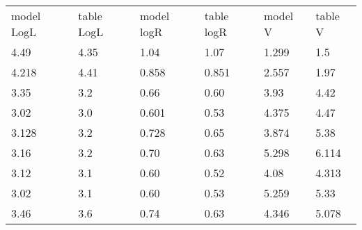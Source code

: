 \documentclass[a4paper,10pt]{article}
\date{02/05/15}
\begin{document}
 \begin{center}
\begin{tabular}{llllll}
model LogL & table LogL & model logR & table logR & model V & table V\\
4.49 & 4.35 & 1.04 & 1.07 & 1.299 & 1.5\\
4.218 & 4.41 & 0.858 & 0.851 & 2.557 & 1.97\\
3.35 & 3.2 & 0.66 & 0.60 & 3.93 & 4.42\\
3.02 & 3.0 & 0.601 & 0.53 & 4.375 & 4.47\\
3.128 & 3.2 & 0.728 & 0.65 & 3.874 & 5.38\\
3.16 & 3.2 & 0.70 & 0.63 & 5.298 & 6.114\\
3.12 & 3.1 & 0.60 & 0.52 & 4.08 & 4.313\\
3.02 & 3.1 & 0.60 & 0.53 & 5.259 & 5.33\\
3.46 & 3.6 & 0.74 & 0.63 & 4.346 & 5.078
 \end{tabular}
 \end{center}
\end{document}
